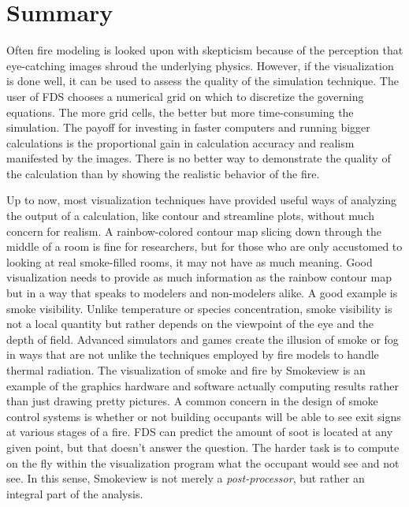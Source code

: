 \documentclass[11pt,twoside]{book}
\begin{document}











\chapter{Summary}
Often fire modeling is looked upon with skepticism because of the
perception that eye-catching images shroud the underlying physics.
However, if the visualization is done well, it can be used to
assess the quality of the simulation technique. The user of FDS
chooses a numerical grid on which to discretize the governing
equations. The more grid cells, the better but more time-consuming
the simulation. The payoff for investing in faster computers and
running bigger calculations is the proportional gain in calculation accuracy and realism
manifested by the images. There is no better way to demonstrate
the quality of the calculation than by showing the realistic
behavior of the fire.

Up to now, most visualization techniques have provided useful ways
of analyzing the output of a calculation, like contour and
streamline plots, without much concern for realism. A
rainbow-colored contour map slicing down through the middle of a
room is fine for researchers, but for those who are only
accustomed to looking at real smoke-filled rooms, it may not have
as much meaning. Good visualization needs to provide as much
information as the rainbow contour map but in a way that speaks to
modelers and non-modelers alike. A good example is smoke
visibility. Unlike temperature or species concentration, smoke
visibility is not a local quantity but rather depends on the
viewpoint of the eye and the depth of field. Advanced simulators
and games create the illusion of smoke or fog in ways that are not
unlike the techniques employed by fire models to handle thermal
radiation. The visualization of smoke and fire by Smokeview is an
example of the graphics hardware and software actually computing
results rather than just drawing pretty pictures. A common concern
in the design of smoke control systems is whether or not building
occupants will be able to see exit signs at various stages of a
fire. FDS can predict the amount of soot is located at any given
point, but that doesn't answer the question. The harder task is to
compute on the fly within the visualization program what the
occupant would see and not see. In this sense, Smokeview is not
merely a {\em post-processor}, but rather an integral part of the
analysis.
\end{document}
